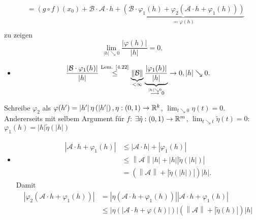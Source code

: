 \begin{proof*}
\begin{align*}
		~ &= \left( g \circ f \right) (x_0) + \mathcal{B} \cdot \mathcal{A} \cdot h + \underbrace{ \left( \mathcal{B} \cdot \varphi_1(h) + \varphi_2 \left( \mathcal{A} \cdot h + \varphi_1(h) \right)  \right) }_{\eqcolon \varphi(h)}\\
	\end{align*}
	zu zeigen
	\[
		\lim_{\left| h \right|  \searrow 0} \frac{ \left| \varphi(h) \right| }{ \left| h \right|  } = 0.
	\]
	\begin{itemize}
		\item 
			\[
				\frac{ \left| \mathcal{B} \cdot \varphi_1(h) \right| }{ \left| h \right|  } \overset{\text{Lem. \ref{4.22}} }{\leq } \underbrace{\left\| \mathcal{B}  \right\| }_{< \infty} \underbrace{ \frac{ \left| \varphi_1 (h) \right| }{ \left| h \right|  }  }_{\overset{\left| h \right| \searrow 0}{\longrightarrow} 0} \to 0, \left| h \right| \searrow 0.
			\]
	\end{itemize}
	Schreibe $ \varphi_2 $ als $ \varphi(h^\prime ) = \left| h^\prime  \right| \eta \left( \left| h^\prime  \right|  \right) , \eta: (0, 1) \to \mathbb{R} ^k $,
	$ \lim_{t \searrow 0} \eta(t) = 0 $.
	Andererseits mit selbem Argument für $ f $: $ \exists \tilde \eta: (0, 1) \to \mathbb{R} ^m $, $ \lim_{t \searrow t} \tilde \eta (t) = 0 $:
	$ \varphi_1(h) = \left| h \right| \tilde \eta \left( \left| h \right|  \right)  $ 
	\begin{itemize}
		\item 
			\begin{align*}
				\left| \mathcal{A} \cdot h + \varphi_1(h) \right| &\leq \left| \mathcal{A} \cdot h \right| + \left| \varphi_1(h) \right| \\
				~ &\leq  \left\| \mathcal{A}  \right\| \left| h \right| + \left| h \right| \left| \tilde \eta \left( \left| h \right|  \right)  \right| \\
				~ &= \left( \left\| \mathcal{A}  \right\| + \left| \tilde \eta \left( \left| h \right|  \right)  \right|  \right) \left| h \right| .
			\end{align*}
			Damit
			\begin{align*}
				\left| \varphi_2 \left( \mathcal{A} \cdot h + \varphi_1(h) \right)  \right| &= \left| \eta\left( \mathcal{A} \cdot h + \varphi_1(h) \right)  \right| \left| \mathcal{A} \cdot h + \varphi_1(h) \right|  \\
				~ & \leq \left| \eta \left( \left| \mathcal{A} \cdot h + \varphi(h) \right|  \right)  \right| \left( \left\| \mathcal{A}  \right\| + \left| \tilde \eta (h) \right|  \right) \left| h \right| \\

\end{align*}
\end{itemize}
\end{proof*}
